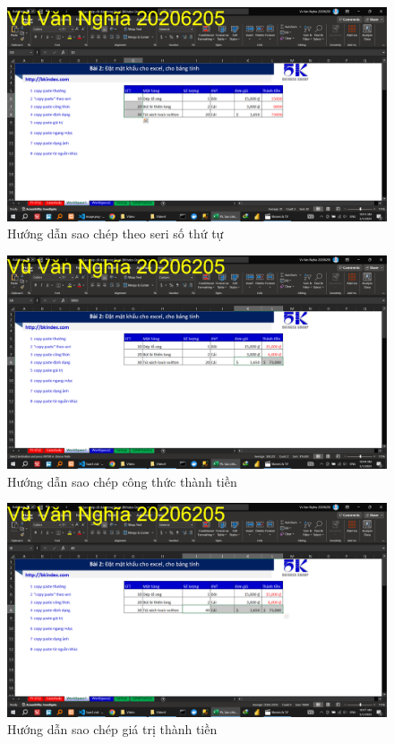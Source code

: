 \documentclass{article}
\begin{document}
\begin{figure}[H]
\centering
\includegraphics[scale = 0.15]{Video4/HuongDan/1.png}
\caption{Hướng dẫn sao chép theo seri số thứ tự}
\end{figure}

\begin{figure}[H]
\centering
\includegraphics[scale = 0.15]{Video4/HuongDan/2.png}
\caption{Hướng dẫn sao chép công thức thành tiền}
\end{figure}

\begin{figure}[H]
\centering
\includegraphics[scale = 0.15]{Video4/HuongDan/3.png}
\caption{Hướng dẫn sao chép giá trị thành tiền}
\end{figure}
\end{document}

